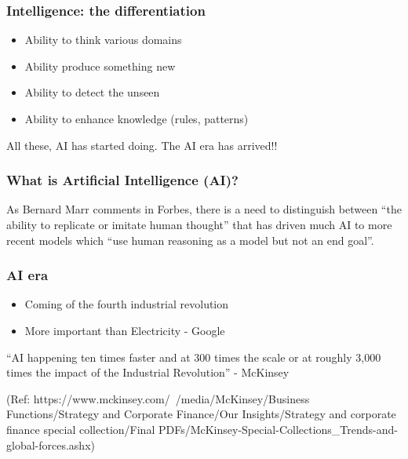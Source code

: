 \begin{frame}[fragile]\frametitle{ Intelligence: the differentiation}
\begin{itemize}
\item Ability to think various domains
\item Ability produce something new
\item Ability to detect the unseen
\item Ability to enhance knowledge (rules, patterns)
\end{itemize}
All these, AI has started doing. The AI era has arrived!!
\end{frame}

\begin{frame}[fragile]\frametitle{ What is Artificial Intelligence (AI)?}
 As Bernard Marr comments in Forbes, there is a need to distinguish between ``the ability to replicate or imitate human thought'' that has driven much AI to more recent models which ``use human reasoning as a model but not an end goal''.

\end{frame}



\begin{frame}[fragile]\frametitle{AI era}
\begin{itemize}
\item Coming of the fourth industrial revolution
\item More important than Electricity - Google
\end{itemize}

``AI happening ten times faster and at 300 times the scale or at roughly 3,000 times the impact of the Industrial Revolution'' - McKinsey

{\tiny (Ref: https://www.mckinsey.com/~/media/McKinsey/Business Functions/Strategy and Corporate Finance/Our Insights/Strategy and corporate finance special collection/Final PDFs/McKinsey-Special-Collections\_Trends-and-global-forces.ashx)}
\end{frame}

